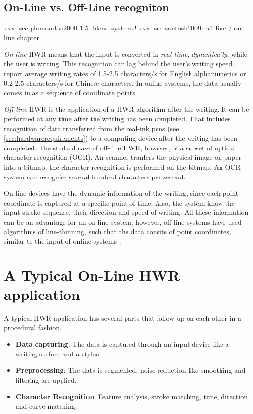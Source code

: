 \subsection{On-Line vs. Off-Line recogniton}
\label{sec:onlinevsoffline}

xxx: see plamondon2000 1.5. blend systems!
xxx: see santosh2009: off-line / on-line chapter

\emph{On-line} HWR means that the input is converted in \emph{real-time}, 
\emph{dynamically}, while the user is writing. This recognition can lag behind
the user's writing speed.  report average writing rates 
of 1.5-2.5 characters/s for English alphanumerics or 0.2-2.5 characters/s for 
Chinese characters. In online systems, the data usually comes in as a sequence 
of coordinate points.

\emph{Off-line} HWR is the application of a HWR algorithm after the writing.
It can be performed at any time after the writing has been completed. That 
includes recognition of data transferred from the real-ink pens 
(see \ref{sec:hardwarerequirements}) to a computing device after the writing
has been completed. The stadard case of off-line HWR, however, is a subset of
optical character recognition (OCR). An scanner tranfers the physical image 
on paper into a bitmap, the character recognition is performed on the bitmap.
An OCR system can recognise several hundred characters per second.

On-line devices have the dynamic information of the writing, since each point 
coordinate is captured at a specific point of time. Also, the system know the
input stroke sequence, their direction and speed of writing. All these 
information can be an advantage for an on-line system, however, off-line systems
have used algorithms of line-thinning, such that the data consits of point
coordinates, similar to the input of online systems .

\section{A Typical On-Line HWR application}
\label{sec:atypicalonlinehwrapplication}

A typical HWR application has several parts that follow up on each other in a
procedural fashion. 
\begin{itemize}
\item \textbf{Data capturing}: The data is captured through an input device 
  like a writing surface and a stylus.
\item \textbf{Preprocessing}: The data is segmented, noise reduction like smoothing and filtering are applied.
\item \textbf{Character Recognition}: Feature analysis, stroke matching, time, 
direction and curve matching.
\end{itemize}

